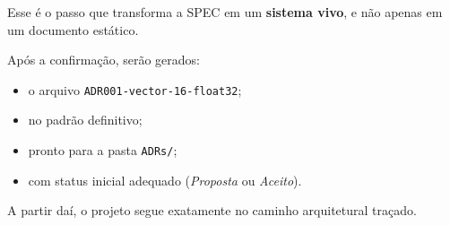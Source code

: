 \documentclass[12pt,a4paper]{article}
\begin{document}
	Esse é o passo que transforma a SPEC em um \textbf{sistema vivo}, e não apenas em um documento estático.
	
	Após a confirmação, serão gerados:
	
	\begin{itemize}[leftmargin=2em]
		\item o arquivo \texttt{ADR001-vector-16-float32};
		\item no padrão definitivo;
		\item pronto para a pasta \texttt{ADRs/};
		\item com status inicial adequado (\emph{Proposta} ou \emph{Aceito}).
	\end{itemize}
	
	\noindent
	A partir daí, o projeto segue exatamente no caminho arquitetural traçado.
	
\end{document}
